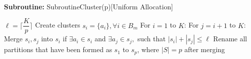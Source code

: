 \noindent\makebox[\linewidth]{\rule{\textwidth}{0.4pt}}\\[-0.6cm]
\newline
\textbf{Subroutine:} SubroutineCluster(p)[Uniform Allocation]\\[-0.3cm]
\begin{algorithmic}[1]
\State \hspace*{2em} $\ell=\bigg\lceil \dfrac{K}{p} \bigg\rceil$
\State \hspace*{2em} Create clusters $s_{i}=\lbrace a_{i}\rbrace, \forall i\in B_{m}$
\State \hspace*{2em} For $i=1$ to $K$:
\State \hspace*{4em} For $j=i+1$ to $K$:
\State \hspace*{6em} Merge $s_{i},s_{j}$ into $s_{i}$ if $\exists a_{i}\in s_{i} $ and $\exists a_{j}\in s_{j},$ such that $|s_{i}|+|s_{j}|\leq \ell$
\State \hspace*{2em} Rename all partitions that have been formed as $s_{1}$ to $s_{p}$, where $|S|=p$ after merging
\end{algorithmic}
\noindent\makebox[\linewidth]{\rule{\textwidth}{0.4pt}}\\[-0.6cm]




